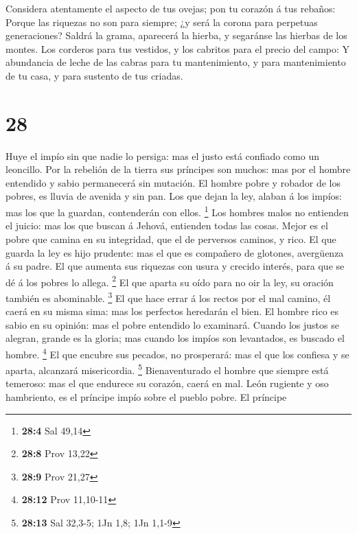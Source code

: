  Considera atentamente el aspecto de tus ovejas; pon tu
corazón á tus rebaños:  Porque las riquezas no son para
siempre; ¿y será la corona para perpetuas generaciones? 
Saldrá la grama, aparecerá la hierba, y segaránse las hierbas de los
montes.  Los corderos para tus vestidos, y los cabritos
para el precio del campo:  Y abundancia de leche de las
cabras para tu mantenimiento, y para mantenimiento de tu casa, y para
sustento de tus criadas.

\hypertarget{section-27}{%
\section{28}\label{section-27}}

 Huye el impío sin que nadie lo persiga: mas el justo está
confiado como un leoncillo.  Por la rebelión de la tierra
sus príncipes son muchos: mas por el hombre entendido y sabio
permanecerá sin mutación.  El hombre pobre y robador de los
pobres, es lluvia de avenida y sin pan.  Los que dejan la
ley, alaban á los impíos: mas los que la guardan, contenderán con ellos.
\footnote{\textbf{28:4} Sal 49,14}  Los hombres malos no
entienden el juicio: mas los que buscan á Jehová, entienden todas las
cosas.  Mejor es el pobre que camina en su integridad, que
el de perversos caminos, y rico.  El que guarda la ley es
hijo prudente: mas el que es compañero de glotones, avergüenza á su
padre.  El que aumenta sus riquezas con usura y crecido
interés, para que se dé á los pobres lo allega. \footnote{\textbf{28:8}
  Prov 13,22}  El que aparta su oído para no oir la ley, su
oración también es abominable. \footnote{\textbf{28:9} Prov 21,27}
 El que hace errar á los rectos por el mal camino, él caerá
en su misma sima: mas los perfectos heredarán el bien.  El
hombre rico es sabio en su opinión: mas el pobre entendido lo examinará.
 Cuando los justos se alegran, grande es la gloria; mas
cuando los impíos son levantados, es buscado el hombre. \footnote{\textbf{28:12}
  Prov 11,10-11}  El que encubre sus pecados, no
prosperará: mas el que los confiesa y se aparta, alcanzará misericordia.
\footnote{\textbf{28:13} Sal 32,3-5; 1Jn 1,8; 1Jn 1,1-9} 
Bienaventurado el hombre que siempre está temeroso: mas el que endurece
su corazón, caerá en mal.  León rugiente y oso hambriento,
es el príncipe impío sobre el pueblo pobre.  El príncipe
